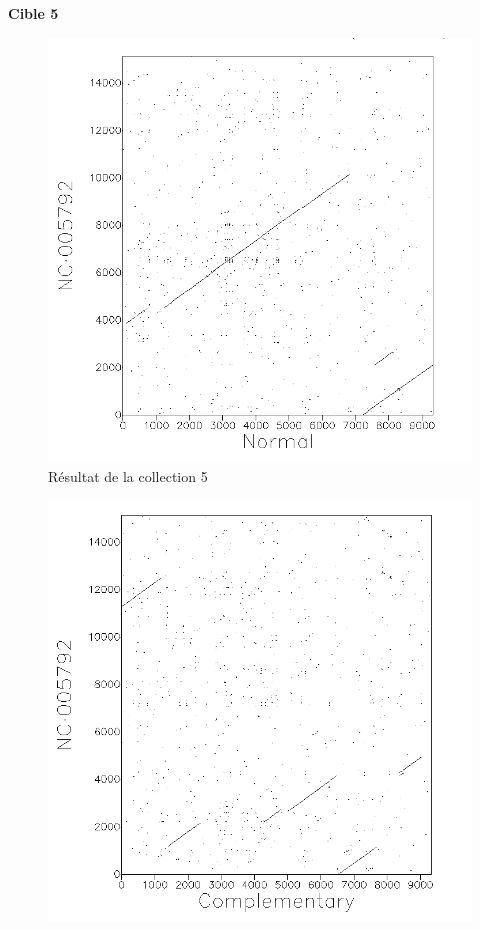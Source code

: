 \FloatBarrier


\noindent\textbf{Cible 5}

\begin{figure}[!ht]
	\begin{minipage}[r]{.46\linewidth}
		\begin{center}
		\includegraphics[scale= 0.4]{../res/cible1.png}
		Résultat de la collection 5
	\end{center}
\end{minipage} \hfill
\begin{minipage}[c]{.46 \linewidth}
	\begin{center}
			\includegraphics[scale= 0.4]{../res/cible1-ic.png}

\end{center}
\end{minipage}
\end{figure}
